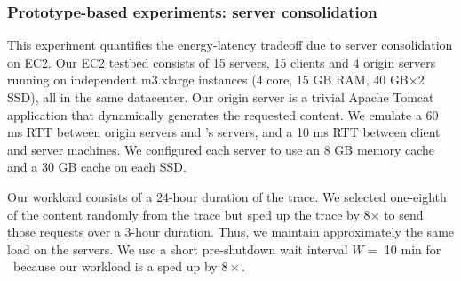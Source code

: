 %



\subsubsection{Prototype-based experiments: server consolidation}
\label{sec:ec2}
\vspace{-0.1in}
This experiment quantifies the energy-latency tradeoff due to server consolidation on EC2. Our EC2 testbed consists of 15 servers, 15 clients and 4 origin servers running on independent m3.xlarge instances (4 core, 15 GB RAM, 40 GB$\times$2 SSD), all in the same datacenter. Our origin server is a trivial Apache Tomcat application that dynamically generates the requested content. We emulate a 60 ms RTT between origin servers and \cdc's servers, and a 10 ms RTT between client and server machines. We configured each server to use an 8 GB memory cache and a 30 GB cache on each SSD. 

Our workload consists of a 24-hour duration of the trace.  We selected one-eighth of the content randomly from the trace but sped up the trace by 8$\times$ to send those requests over a 3-hour duration. Thus, we  maintain approximately the same load on the servers. We use a short pre-shutdown wait interval $W =$ 10 min for \shrink\ because our workload is a sped up by $8\times$.

